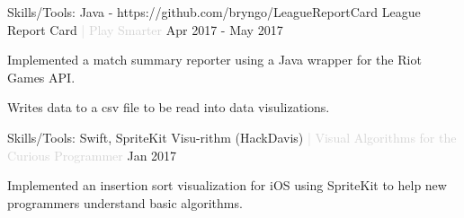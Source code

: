 \begin{cventries}
  \cventry
  {Skills/Tools: Java - https://github.com/bryngo/LeagueReportCard} %
  {League Report Card \textcolor{lightgray}{| Play Smarter}} %
  {} %
  {Apr 2017 - May 2017} %
  {
  \begin{cvitems} %
    \item {Implemented a match summary reporter using a Java wrapper for the Riot Games API.}
    \item {Writes data to a csv file to be read into data visulizations.}
  \end{cvitems}
  }
  \cventry
  {Skills/Tools: Swift, SpriteKit} %
  {Visu-rithm (HackDavis) \textcolor{lightgray}{| Visual Algorithms for the Curious Programmer}} %
  {} %
  {Jan 2017} %
  {
  \begin{cvitems} %
    \item {Implemented an insertion sort visualization for iOS using SpriteKit to help new programmers understand basic algorithms.}
  \end{cvitems}
  }

\end{cventries}
